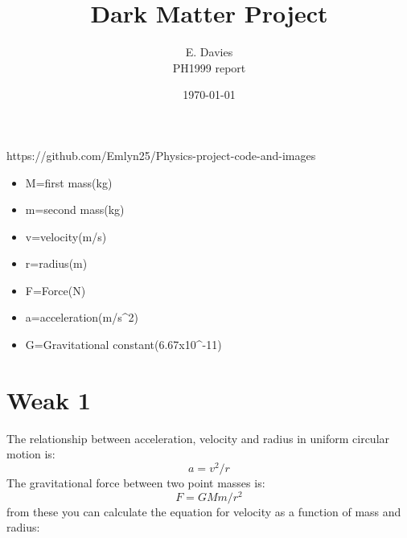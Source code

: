 \documentclass[10pt, twocolumn, twoside]{article}
\author{E. Davies\\PH1999 report}
\title{Dark Matter Project}
\date{\today}
\begin{document}
\maketitle %

\begin{git}
https://github.com/Emlyn25/Physics-project-code-and-images
\end{git}




\begin{itemize}
  \item M=first mass(kg)
  \item m=second mass(kg)
  \item v=velocity(m/s)
  \item r=radius(m)
  \item F=Force(N)
  \item a=acceleration(m/s^2)
  
  \item G=Gravitational constant(6.67x10^-11)
\end{itemize}


\section{Weak 1}
The relationship between acceleration, velocity and radius in uniform circular motion is:
\label{GaussE}
\begin{equation}
a=v^2/r
\end{equation}
The gravitational force between two point masses is:
\begin{equation}
\label{GaussE}
F=GMm/r^2
\end{equation}
from these you can calculate the equation for velocity as a function of mass and radius:
\end{document}
